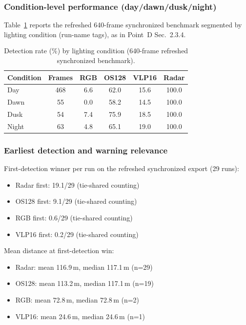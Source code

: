 \subsubsection{Condition-level performance (day/dawn/dusk/night)}
Table~\ref{tab:det-rate-light} reports the refreshed 640-frame synchronized benchmark segmented by lighting condition (run-name tags), as in Point~D Sec.~2.3.4.

\begin{table}[ht]
  \centering
  \caption{Detection rate (\%) by lighting condition (640-frame refreshed synchronized benchmark).}
  \label{tab:det-rate-light}
  \begin{tabular}{lccccc}
    \hline
    \textbf{Condition} & \textbf{Frames} & \textbf{RGB} & \textbf{OS128} & \textbf{VLP16} & \textbf{Radar} \\
    \hline
    Day   & 468 & 6.6 & 62.0 & 15.6 & 100.0 \\
    Dawn  &  55 & 0.0 & 58.2 & 14.5 & 100.0 \\
    Dusk  &  54 & 7.4 & 75.9 & 18.5 & 100.0 \\
    Night &  63 & 4.8 & 65.1 & 19.0 & 100.0 \\
    \hline
  \end{tabular}
\end{table}

\subsubsection{Earliest detection and warning relevance}
First-detection winner per run on the refreshed synchronized export (29 runs):
\begin{itemize}
  \item Radar first: 19.1/29 (tie-shared counting)
  \item OS128 first: 9.1/29 (tie-shared counting)
  \item RGB first: 0.6/29 (tie-shared counting)
  \item VLP16 first: 0.2/29 (tie-shared counting)
\end{itemize}

Mean distance at first-detection win:
\begin{itemize}
  \item Radar: mean 116.9\,m, median 117.1\,m (n=29)
  \item OS128: mean 113.2\,m, median 117.1\,m (n=19)
  \item RGB: mean 72.8\,m, median 72.8\,m (n=2)
  \item VLP16: mean 24.6\,m, median 24.6\,m (n=1)
\end{itemize}

